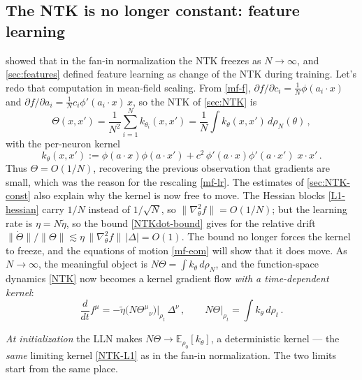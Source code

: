 \documentclass[11pt]{article}
\newcommand{\E}{\mathbb{E}}
\newcommand{\pd}{\partial}
\begin{document}
\subsection{The NTK is no longer constant: feature learning}
\label{sec:MFT-NTK}

 showed that in the fan-in normalization the NTK freezes as $N\to\infty$, and \cref{sec:features} defined feature learning as change of the NTK during training. Let's redo that computation in mean-field scaling. From \eqref{mf-f}, $\pd f/\pd c_i = \frac{1}{N}\phi(a_i\cdot x)$ and $\pd f/\pd a_i = \frac{1}{N} c_i\phi'(a_i\cdot x)\,x$, so the NTK of \cref{sec:NTK} is
%
\begin{equation} \label{mf-ntk}
    \Theta(x,x') = \frac{1}{N^2}\sum_{i=1}^N k_{\theta_i}(x,x') = \frac{1}{N} \int k_\theta(x,x')\, d\rho_N(\theta)\,,
\end{equation}
%
with the per-neuron kernel
%
\begin{equation}
    k_\theta(x,x') := \phi(a\cdot x)\phi(a\cdot x') + c^2\,\phi'(a\cdot x)\phi'(a\cdot x')\; x\cdot x'\,.
\end{equation}
%
Thus $\Theta = O(1/N)$, recovering the previous observation that gradients are small, which was the reason for the rescaling \eqref{mf-lr}. The estimates of \cref{sec:NTK-const} also explain why the kernel is now free to move. The Hessian blocks \eqref{L1-hessian} carry $1/N$ instead of $1/\sqrt N$, so $\|\nabla_\theta^2 f\| = O(1/N)$; but the learning rate is $\eta = N\tilde\eta$, so the bound \eqref{NTKdot-bound} gives for the relative drift $\|\dot\Theta\|/\|\Theta\| \lesssim \eta\,\|\nabla^2_\theta f\|\,|\Delta| = O(1)$. The bound no longer forces the kernel to freeze, and the equations of motion \eqref{mf-eom} will show that it does move. As $N\to \infty$, the meaningful object is $N\Theta = \int k_\theta\, d\rho_N$, and the function-space dynamics \eqref{NTK} now becomes a kernel gradient flow \emph{with a time-dependent kernel}:
%
\begin{equation} \label{mf-kernelflow}
    \frac{d}{dt} f^\mu = -\tilde\eta \big(N\Theta^\mu{}_\nu\big)\big|_{\rho_t}\, \Delta^\nu\,,
    \qquad
    N\Theta\big|_{\rho_t} = \int k_\theta\, d\rho_t\,.
\end{equation}
%

\emph{At initialization} the LLN makes $N\Theta \to \E_{\rho_0}[k_\theta]$, a deterministic kernel --- the \emph{same} limiting kernel \eqref{NTK-L1} as in the fan-in normalization. The two limits start from the same place.
\end{document}
